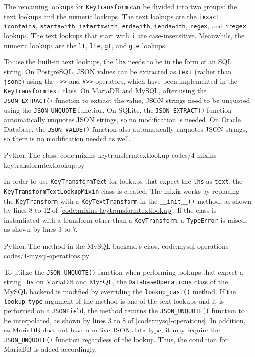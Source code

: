 The remaining lookups for \verb|KeyTransform| can be divided into two groups:
the text lookups and the numeric lookups. The text lookups are the
\verb|iexact|, \verb|icontains|, \verb|startswith|, \verb|istartswith|,
\verb|endswith|, \verb|iendswith|, \verb|regex|, and \verb|iregex| lookups. The
text lookups that start with \verb|i| are case-insensitive. Meanwhile, the
numeric lookups are the \verb|lt|, \verb|lte|, \verb|gt|, and \verb|gte|
lookups.

To use the built-in text lookups, the \verb|lhs| needs to be in the form of an
SQL string. On PostgreSQL, JSON values can be extracted as \verb|text| (rather
than \verb|jsonb|) using the \verb|->>| and \verb|#>>| operators, which have
been implemented in the \verb|KeyTransformText| class. On MariaDB and MySQL,
after using the \verb|JSON_EXTRACT()| function to extract the value, JSON
strings need to be unquoted using the \verb|JSON_UNQUOTE| function. On SQLite,
the \verb|JSON_EXTRACT()| function automatically unquotes JSON strings, so no
modification is needed. On Oracle Database, the \verb|JSON_VALUE()| function
also automatically unquotes JSON strings, so there is no modification needed as
well.

\listing
{Python}
{The  class.}
{code:mixins-keytransformtextlookup}
{codes/4-mixins-keytransformtextlookup.py}

In order to use \verb|KeyTransformText| for lookups that expect the \verb|lhs|
as \verb|text|, the \verb|KeyTransformTextLookupMixin| class is created. The
mixin works by replacing the \verb|KeyTransform| with a \verb|KeyTextTransform|
in the \verb|__init__()| method, as shown by lines 8 to 12 of
\autoref{code:mixins-keytransformtextlookup}. If the class is instantiated with
a transform other than a \verb|KeyTransform|, a \verb|TypeError| is raised, as
shown by lines 3 to 7.

\listing
{Python}
{The  method in the MySQL backend's
 class.}
{code:mysql-operations}
{codes/4-mysql-operations.py}

To utilize the \verb|JSON_UNQUOTE()| function when performing lookups that
expect a string \verb|lhs| on MariaDB and MySQL, the \verb|DatabaseOperations|
class of the MySQL backend is modified by overriding the \verb|lookup_cast()|
method. If the \verb|lookup_type| argument of the method is one of the text
lookups and it is performed on a \verb|JSONField|, the method returns the
\verb|JSON_UNQUOTE()| function to be interpolated, as shown by lines 3 to 8 of
\autoref{code:mysql-operations}. In addition, as MariaDB does not have a native
JSON data type, it may require the \verb|JSON_UNQUOTE()| function regardless of
the lookup. Thus, the condition for MariaDB is added accordingly.


